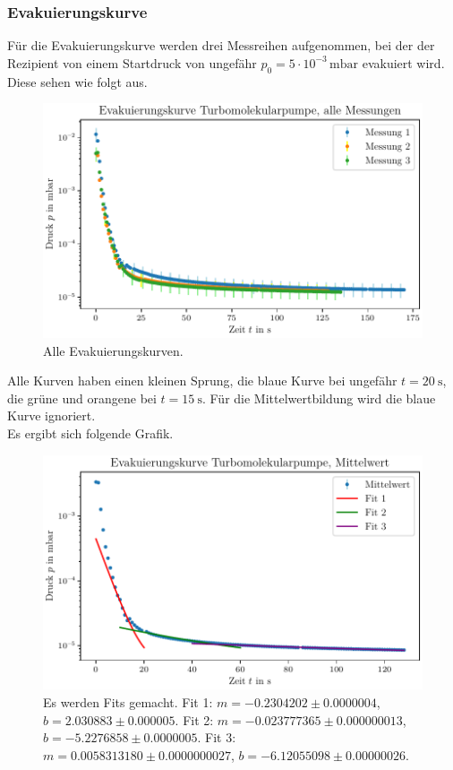 \subsubsection{Evakuierungskurve}
Für die Evakuierungskurve werden drei Messreihen aufgenommen, bei der der Rezipient von einem Startdruck von ungefähr $p_0 = \num{5} \cdot 10^{-3} \, \si{\milli\bar}$ evakuiert wird.
Diese sehen wie folgt aus.

\begin{figure}[H]
    \centering
    \includegraphics[width=\textwidth]{plots/TP_Evakuierungskurve_alle.pdf}
    \caption{Alle Evakuierungskurven.}
    \label{fig:TP_evak_alle}
\end{figure}

Alle Kurven haben einen kleinen Sprung, die blaue Kurve bei ungefähr $t = \SI{20}{\second}$, die grüne und orangene bei $t = \SI{15}{\second}$.
Für die Mittelwertbildung wird die blaue Kurve ignoriert. \\
Es ergibt sich folgende Grafik.

\begin{figure}[H]
    \centering
    \includegraphics[width=\textwidth]{plots/TP_Evakuierungskurve.pdf}
    \caption{Es werden Fits gemacht. Fit 1: $m = \num{-0.2304202} \pm \num{0.0000004}$, $b = \num{2.030883} \pm \num{0.000005}$. Fit 2: $m = \num{-0.023777365} \pm \num{0.000000013}$, $b = \num{-5.2276858} \pm \num{0.0000005}$. Fit 3: $m = \num{0.0058313180} \pm \num{0.0000000027}$, $b = \num{-6.12055098} \pm \num{0.00000026}$.}
    \label{fig:TP_evak}
\end{figure}


